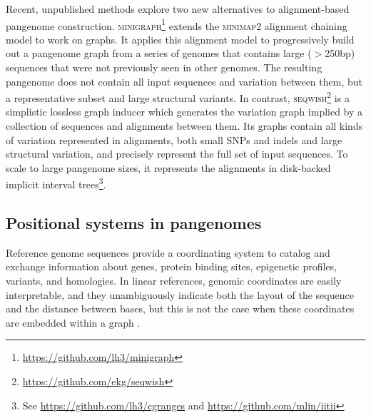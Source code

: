 Recent, unpublished methods explore two new alternatives to alignment-based pangenome construction.
\textsc{minigraph}\footnote{\url{https://github.com/lh3/minigraph}} extends the \textsc{minimap2} \cite{Li_2018} alignment chaining model to work on graphs.
It applies this alignment model to progressively build out a pangenome graph from a series of genomes that contains large ($>$250bp) sequences that were not previously seen in other genomes.
The resulting pangenome does not contain all input sequences and variation between them, but a representative subset and large structural variants.
In contrast, \textsc{seqwish}\footnote{\url{https://github.com/ekg/seqwish}} \cite{Garrison_2019} is a simplistic lossless graph inducer which generates the variation graph implied by a collection of sequences and alignments between them.
Its graphs contain all kinds of variation represented in alignments, both small SNPs and indels and large structural variation, and precisely represent the full set of input sequences.
To scale to large pangenome sizes, it represents the alignments in disk-backed implicit interval trees\footnote{See \url{https://github.com/lh3/cgranges} and \url{https://github.com/mlin/iitii}}.








\subsection{Positional systems in pangenomes}

Reference genome sequences provide a coordinating system to catalog and exchange information about genes, protein binding sites, epigenetic profiles, variants, and homologies.
In linear references, genomic coordinates are easily interpretable, and they unambiguously indicate both the layout of the sequence and the distance between bases, but this is not the case when these coordinates are embedded within a graph \cite{Rand_2017}.

